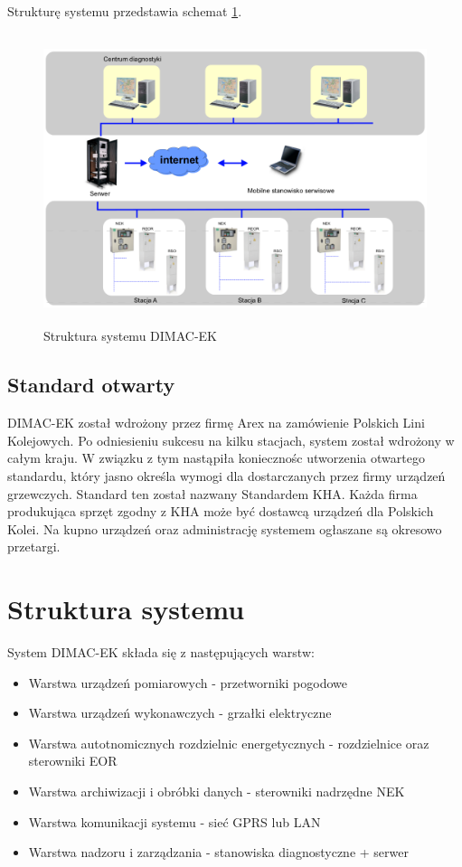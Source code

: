 Strukturę systemu przedstawia schemat \ref{fig:dimacek-scheme}.
\begin{figure}[h]
	\includegraphics[height=85mm]{./img/dimacek_struktura.png}
	\caption{Struktura systemu DIMAC-EK}
	\label{fig:dimacek-scheme}
\end{figure}

\subsection{Standard otwarty}
DIMAC-EK został wdrożony przez firmę Arex na zamówienie Polskich Lini Kolejowych. Po odniesieniu sukcesu na kilku stacjach, system został wdrożony w całym kraju. W związku z tym nastąpiła koniecznośc utworzenia otwartego standardu, który jasno określa wymogi dla dostarczanych przez firmy urządzeń grzewczych. Standard ten został nazwany Standardem KHA. Każda firma produkująca sprzęt zgodny z KHA może być dostawcą urządzeń dla Polskich Kolei. Na kupno urządzeń oraz administrację systemem ogłaszane są okresowo przetargi.

\section{Struktura systemu}
System DIMAC-EK składa się z następujących warstw:\cite{dimacek-wytyczne}
\begin{itemize}
\item Warstwa urządzeń pomiarowych - przetworniki pogodowe
\item Warstwa urządzeń wykonawczych - grzałki elektryczne
\item Warstwa autotnomicznych rozdzielnic energetycznych - rozdzielnice oraz sterowniki EOR
\item Warstwa archiwizacji i obróbki danych - sterowniki nadrzędne NEK
\item Warstwa komunikacji systemu - sieć GPRS lub LAN
\item Warstwa nadzoru i zarządzania - stanowiska diagnostyczne + serwer
\end{itemize}


